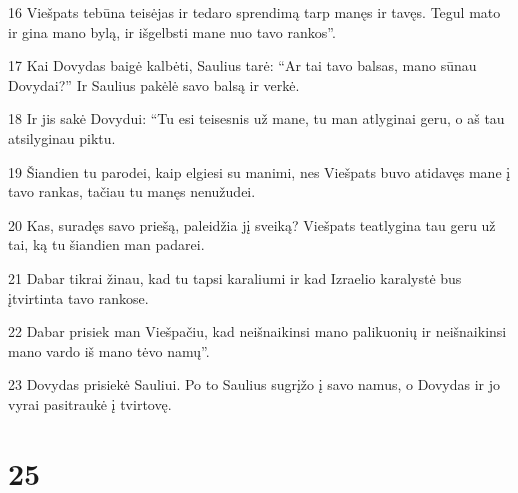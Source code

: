 \par 16 Viešpats tebūna teisėjas ir tedaro sprendimą tarp manęs ir tavęs. Tegul mato ir gina mano bylą, ir išgelbsti mane nuo tavo rankos”. 
\par 17 Kai Dovydas baigė kalbėti, Saulius tarė: “Ar tai tavo balsas, mano sūnau Dovydai?” Ir Saulius pakėlė savo balsą ir verkė. 
\par 18 Ir jis sakė Dovydui: “Tu esi teisesnis už mane, tu man atlyginai geru, o aš tau atsilyginau piktu. 
\par 19 Šiandien tu parodei, kaip elgiesi su manimi, nes Viešpats buvo atidavęs mane į tavo rankas, tačiau tu manęs nenužudei. 
\par 20 Kas, suradęs savo priešą, paleidžia jį sveiką? Viešpats teatlygina tau geru už tai, ką tu šiandien man padarei. 
\par 21 Dabar tikrai žinau, kad tu tapsi karaliumi ir kad Izraelio karalystė bus įtvirtinta tavo rankose. 
\par 22 Dabar prisiek man Viešpačiu, kad neišnaikinsi mano palikuonių ir neišnaikinsi mano vardo iš mano tėvo namų”. 
\par 23 Dovydas prisiekė Sauliui. Po to Saulius sugrįžo į savo namus, o Dovydas ir jo vyrai pasitraukė į tvirtovę.



\chapter{25}


